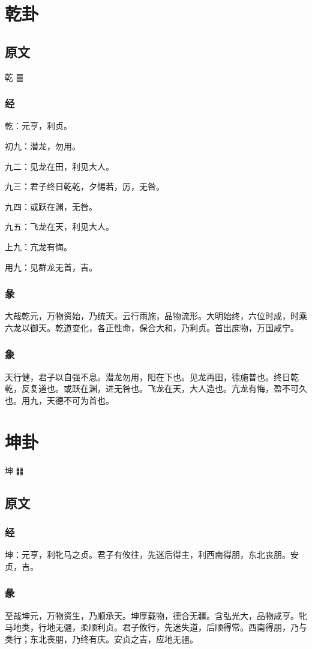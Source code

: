 \documentclass[12pt,oneside]{book}
\begin{document}
\chapter{乾卦}
\section{原文}
乾  ䷀


\subsection{经}
乾：元亨，利贞。

初九：潜龙，勿用。

九二：见龙在田，利见大人。

九三：君子终日乾乾，夕惕若，厉，无咎。

九四：或跃在渊，无咎。

九五：飞龙在天，利见大人。

上九：亢龙有悔。

用九：见群龙无首，吉。


\subsection{彖}
大哉乾元，万物资始，乃统天。云行雨施，品物流形。大明始终，六位时成，时乘六龙以御天。乾道变化，各正性命，保合大和，乃利贞。首出庶物，万国咸宁。

\subsection{象}
天行健，君子以自强不息。潜龙勿用，阳在下也。见龙再田，德施普也。终日乾乾，反复道也。或跃在渊，进无咎也。飞龙在天，大人造也。亢龙有悔，盈不可久也。用九，天德不可为首也。

\chapter{坤卦}
坤 ䷁

\section{原文}
\subsection{经}
坤：元亨，利牝马之贞。君子有攸往，先迷后得主，利西南得朋，东北丧朋。安贞，吉。

\subsection{彖}
至哉坤元，万物资生，乃顺承天。坤厚载物，德合无疆。含弘光大，品物咸亨。牝马地类，行地无疆，柔顺利贞。君子攸行，先迷失道，后顺得常。西南得朋，乃与类行；东北丧朋，乃终有庆。安贞之吉，应地无疆。
\end{document}

